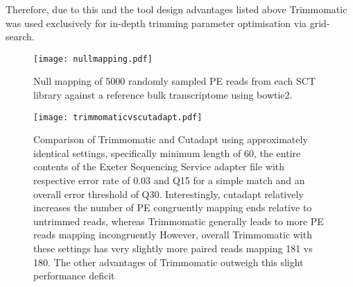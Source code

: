 Therefore, due to this and the tool design advantages listed above Trimmomatic was used exclusively for 
in-depth trimming parameter optimisation via grid-search.


\begin{figure}[h]
    \texttt{[image: nullmapping.pdf]}
    \caption{Null mapping of 5000 randomly sampled PE reads from each SCT library 
                against a reference bulk transcriptome using bowtie2.
            }
    \label{fig:nullmapping}
\end{figure}


\begin{figure}[h]
    \texttt{[image: trimmomaticvscutadapt.pdf]}
    \caption{Comparison of Trimmomatic and Cutadapt using approximately identical settings,
        specifically minimum length of 60, the entire contents of the Exeter Sequencing Service
        adapter file with respective error rate of 0.03 and Q15 for a simple match and an overall
        error threshold of Q30.
        Interestingly, cutadapt relatively increases the number of PE congruently mapping ends
        relative to untrimmed reads, whereas Trimmomatic generally leads to more PE reads mapping incongruently
        However, overall Trimmomatic with these settings has very slightly more paired reads mapping 
        181 vs 180.  
        The other advantages of Trimmomatic outweigh this slight performance deficit}
    \label{fig:cvt}
\end{figure}

%
%





